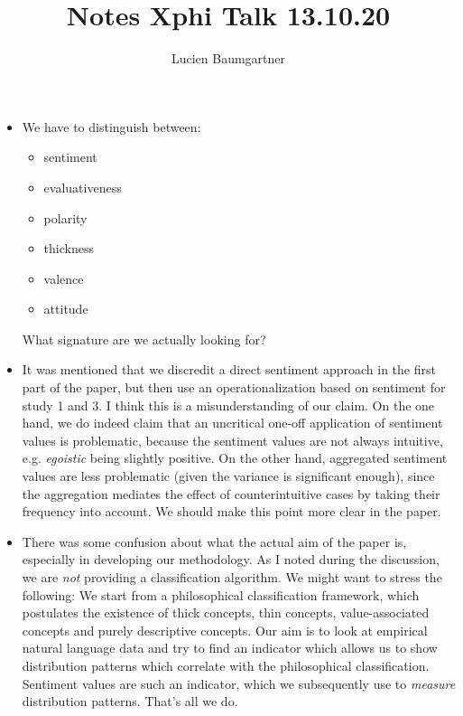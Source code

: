 \documentclass{article}
\title{Notes Xphi Talk 13.10.20}
\author{Lucien Baumgartner}
\begin{document}
\maketitle

\begin{itemize}
\item We have to distinguish between:
	\begin{itemize}
	\item sentiment
	\item evaluativeness
	\item polarity
	\item  thickness
	\item valence
	\item attitude
	\end{itemize}
	
What signature are we actually looking for?
	
\item It was mentioned that we discredit a direct sentiment approach in the first part of the paper, but then use an operationalization based on sentiment for study 1 and 3. I think this is a misunderstanding of our claim. On the one hand, we do indeed claim that an uncritical one-off application of sentiment values is problematic, because the sentiment values are not always intuitive, e.g. \textit{egoistic} being slightly positive. On the other hand, aggregated sentiment values are less problematic (given the variance is significant enough), since the aggregation mediates the effect of counterintuitive cases by taking their frequency into account. We should make this point more clear in the paper.

\item There was some confusion about what the actual aim of the paper is, especially in developing our methodology. As I noted during the discussion, we are \textit{not} providing a classification algorithm. We might want to stress the following: We start from a philosophical classification framework, which postulates the existence of thick concepts, thin concepts, value-associated concepts and purely descriptive concepts. Our aim is to look at empirical natural language data and try to find an indicator which allows us to show distribution patterns which correlate with the philosophical classification. Sentiment values are such an indicator, which we subsequently use to \textit{measure} distribution patterns. That's all we do. 


\end{itemize}
\end{document}
